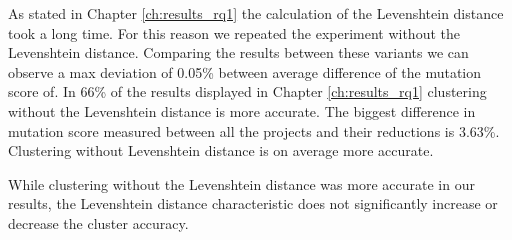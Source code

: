 \documentclass[../main]{subfiles}
\begin{document}
As stated in Chapter \ref{ch:results_rq1} the calculation of the Levenshtein distance took a long time.
For this reason we repeated the experiment without the Levenshtein distance.
Comparing the results between these variants we can observe a max deviation of 0.05\% between average difference of the mutation score of.
In 66\% of the results displayed in Chapter \ref{ch:results_rq1} clustering without the Levenshtein distance is more accurate.
The biggest difference in mutation score measured between all the projects and their reductions is 3.63\%.
Clustering without Levenshtein distance is on average more accurate.
\begin{finding}
    While clustering without the Levenshtein distance was more accurate in our results, the Levenshtein distance characteristic does not significantly increase or decrease the cluster accuracy.
\end{finding}
\end{document}
